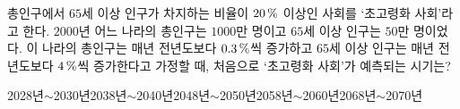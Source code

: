 총인구에서 $65$세 이상 인구가 차지하는 비율이 $20\mkern3mu \%$ 이상인 사회를 ‘초고령화 사회’라고 한다. $2000$년 어느 나라의 총인구는 $1000$만 명이고 $65$세 이상 인구는 $50$만 명이었다. 이 나라의 총인구는 매년 전년도보다 $0.3\mkern3mu \%$씩 증가하고 $65$세 이상 인구는 매년 전년도보다 $4\mkern3mu \%$씩 증가한다고 가정할 때, 처음으로 ‘초고령화 사회’가 예측되는 시기는? 
\begin{choices32}{2028년$\sim$2030년}{2038년$\sim$2040년}{2048년$\sim$2050년}{2058년$\sim$2060년}{2068년$\sim$2070년}\end{choices32}
